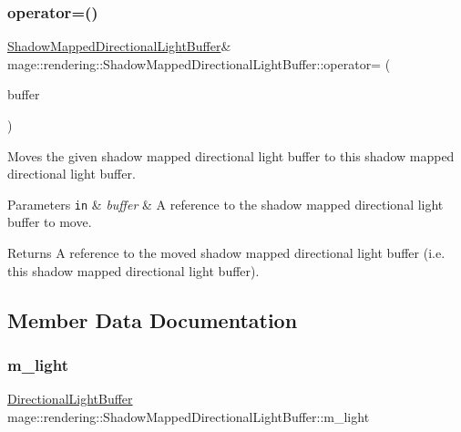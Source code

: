 \subsubsection{\texorpdfstring{operator=()}{operator=()}\hspace{0.1cm}{\footnotesize\ttfamily [2/2]}}
{\footnotesize\ttfamily \mbox{\hyperlink{structmage_1_1rendering_1_1_shadow_mapped_directional_light_buffer}{Shadow\+Mapped\+Directional\+Light\+Buffer}}\& mage\+::rendering\+::\+Shadow\+Mapped\+Directional\+Light\+Buffer\+::operator= (\begin{DoxyParamCaption}\item[{\mbox{\hyperlink{structmage_1_1rendering_1_1_shadow_mapped_directional_light_buffer}{Shadow\+Mapped\+Directional\+Light\+Buffer}} \&\&}]{buffer }\end{DoxyParamCaption})\hspace{0.3cm}{\ttfamily [default]}}

Moves the given shadow mapped directional light buffer to this shadow mapped directional light buffer.


\begin{DoxyParams}[1]{Parameters}
\mbox{\tt in}  & {\em buffer} & A reference to the shadow mapped directional light buffer to move. \\
\hline
\end{DoxyParams}
\begin{DoxyReturn}{Returns}
A reference to the moved shadow mapped directional light buffer (i.\+e. this shadow mapped directional light buffer). 
\end{DoxyReturn}


\subsection{Member Data Documentation}
\mbox{\label{structmage_1_1rendering_1_1_shadow_mapped_directional_light_buffer_a3aa791aa543feb7a92a42251ea6b655e}} 
\subsubsection{\texorpdfstring{m\+\_\+light}{m\_light}}
{\footnotesize\ttfamily \mbox{\hyperlink{structmage_1_1rendering_1_1_directional_light_buffer}{Directional\+Light\+Buffer}} mage\+::rendering\+::\+Shadow\+Mapped\+Directional\+Light\+Buffer\+::m\+\_\+light}

